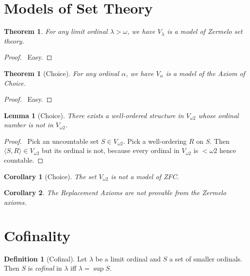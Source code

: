 \documentclass{report}
\let\qed\relax
\newtheorem{lemma}[axiom]{Lemma}
\newtheorem{theorem}[axiom]{Theorem}
\newtheorem{corollary}{Corollary}[axiom]
\theoremstyle{definition}
\newtheorem{definition}[axiom]{Definition}
\begin{document}
    \section{Models of Set Theory}

    \begin{theorem}
        For any limit ordinal $\lambda > \omega$, we have $V_\lambda$ is a model of Zermelo set theory.
    \end{theorem}

    \begin{proof}
        \pf\ Easy. \qed
    \end{proof}

    \begin{theorem}[Choice]
        For any ordinal $\alpha$, we have $V_\alpha$ is a model of the Axiom of Choice.
    \end{theorem}

    \begin{proof}
        \pf\ Easy. \qed
    \end{proof}

    \begin{lemma}[Choice]
        There exists a well-ordered structure in $V_{\omega 2}$ whose ordinal number is not in $V_{\omega 2}$.
    \end{lemma}

    \begin{proof}
        \pf\ Pick an uncountable set $S \in V_{\omega 2}$. Pick a well-ordering $R$ on $S$. Then
        $\langle S,R \rangle \in V_{\omega 2}$ but its ordinal is not, because every ordinal in
        $V_{\omega 2}$ is $< \omega 2$ hence countable. \qed
    \end{proof}

    \begin{corollary}[Choice]
        The set $V_{\omega 2}$ is not a model of ZFC.
    \end{corollary}

    \begin{corollary}
        The Replacement Axioms are not provable from the Zermelo axioms.
    \end{corollary}

    \section{Cofinality}

    \begin{definition}[Cofinal]
        Let $\lambda$ be a limit ordinal and $S$ a set of smaller ordinals. Then $S$ is \emph{cofinal} in
        $\lambda$ iff $\lambda = \sup S$.
    \end{definition}
\end{document}
